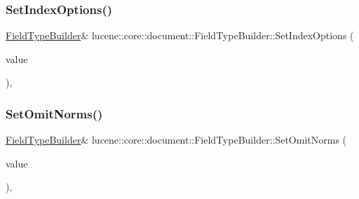 \mbox{\label{classlucene_1_1core_1_1document_1_1FieldTypeBuilder_a8bac1b342eb1a01f057698f04bb657ec}} 
\subsubsection{\texorpdfstring{Set\+Index\+Options()}{SetIndexOptions()}}
{\footnotesize\ttfamily \mbox{\hyperlink{classlucene_1_1core_1_1document_1_1FieldTypeBuilder}{Field\+Type\+Builder}}\& lucene\+::core\+::document\+::\+Field\+Type\+Builder\+::\+Set\+Index\+Options (\begin{DoxyParamCaption}\item[{\mbox{\hyperlink{ZlibCrc32_8h_a2c212835823e3c54a8ab6d95c652660e}{const}} \mbox{\hyperlink{namespacelucene_1_1core_1_1index_a0d5e1f98471a76de106056cf3b5a7897}{lucene\+::core\+::index\+::\+Index\+Options}}}]{value }\end{DoxyParamCaption})\hspace{0.3cm}{\ttfamily [inline]}, {\ttfamily [noexcept]}}

\mbox{\label{classlucene_1_1core_1_1document_1_1FieldTypeBuilder_a0353947b265377527127242bd54866ef}} 
\subsubsection{\texorpdfstring{Set\+Omit\+Norms()}{SetOmitNorms()}}
{\footnotesize\ttfamily \mbox{\hyperlink{classlucene_1_1core_1_1document_1_1FieldTypeBuilder}{Field\+Type\+Builder}}\& lucene\+::core\+::document\+::\+Field\+Type\+Builder\+::\+Set\+Omit\+Norms (\begin{DoxyParamCaption}\item[{\mbox{\hyperlink{ZlibCrc32_8h_a2c212835823e3c54a8ab6d95c652660e}{const}} bool}]{value }\end{DoxyParamCaption})\hspace{0.3cm}{\ttfamily [inline]}, {\ttfamily [noexcept]}}


